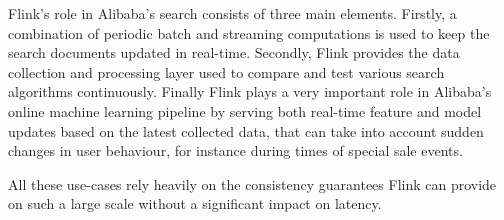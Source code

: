 Flink's role in Alibaba's search consists of three main elements. Firstly, a combination of periodic batch and streaming computations is used to keep the search documents updated in real-time. Secondly, Flink provides the data collection and processing layer used to compare and test various search algorithms continuously. Finally Flink plays a very important role in Alibaba's online machine learning pipeline by serving both real-time feature and model updates based on the latest collected data, that can take into account sudden changes in user behaviour, for instance during times of special sale events.

All these use-cases rely heavily on the consistency guarantees Flink can provide on such a large scale without a significant impact on latency.


 \\

